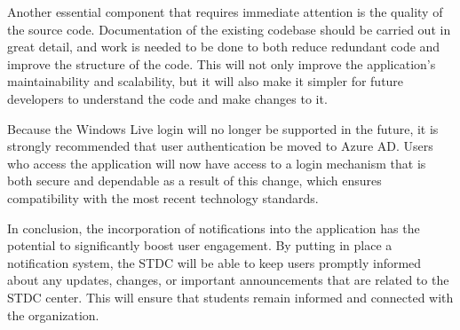 \begin{justify}
        \vspace{0.25cm}
        \newendline Another essential component that requires immediate attention is the quality of the source code. Documentation of the existing codebase should be carried out in great detail, and work is needed to be done to both reduce redundant code and improve the structure of the code. This will not only improve the application's maintainability and scalability, but it will also make it simpler for future developers to understand the code and make changes to it.

        \vspace{0.25cm}
        \newendline Because the Windows Live login will no longer be supported in the future, it is strongly recommended that user authentication be moved to Azure AD. Users who access the application will now have access to a login mechanism that is both secure and dependable as a result of this change, which ensures compatibility with the most recent technology standards.

        \vspace{0.25cm}
        \newendline In conclusion, the incorporation of notifications into the application has the potential to significantly boost user engagement. By putting in place a notification system, the STDC will be able to keep users promptly informed about any updates, changes, or important announcements that are related to the STDC center. This will ensure that students remain informed and connected with the organization.
    \clearpage
    
\end{justify}
\clearpage